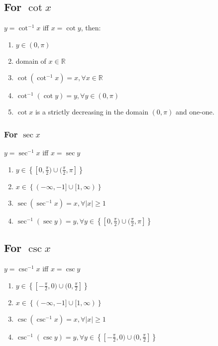 \documentclass[../main.tex]{subfile}
\begin{document}
    \subsection{For $\cot x$}
        $y=\cot^{-1} x$ iff $x=\cot y$, then:
    \begin{enumerate}
        \item $y \in (0,\pi)$
        \item domain of $x \in \mathbb{R}$
        \item $\cot(\cot^{-1} x)=x,\forall x\in\mathbb{R}$
        \item $\cot^{-1}(\cot y)=y, \forall y\in (0,\pi)$
        \item $\cot x$ is a strictly decreasing in the domain $(0,\pi)$ and one-one.
    \end{enumerate}

    \subsubsection{For $\sec x$}
        $y=\sec^{-1} x$ iff $x=\sec y$
    \begin{enumerate}
        \item $y\in\left\lbrace [0,\frac{\pi}{2})\cup(\frac{\pi}{2},\pi]\right\rbrace$
        \item $x\in\left\lbrace(-\infty,-1]\cup[1,\infty)\right\rbrace$
        \item $\sec(\sec^{-1}x)=x,\forall \lvert x \rvert \geq 1$
        \item $\sec^{-1}(\sec y)=y, \forall y \in \left\lbrace [0,\frac{\pi}{2})\cup(\frac{\pi}{2},\pi]\right\rbrace$
    \end{enumerate}

    \subsection{For $\csc x$}
        $y=\csc^{-1} x$ iff $x=\csc y$
    \begin{enumerate}
        \item $y\in\left\lbrace [-\frac{\pi}{2},0)\cup(0,\frac{\pi}{2}]\right\rbrace$
        \item $x\in\left\lbrace(-\infty,-1]\cup[1,\infty)\right\rbrace$
        \item $\csc(\csc^{-1}x)=x,\forall \lvert x \rvert \geq 1$
        \item $\csc^{-1}(\csc y)=y, \forall y \in \left\lbrace [-\frac{\pi}{2},0)\cup(0,\frac{\pi}{2}]\right\rbrace$
    \end{enumerate}
\end{document}

